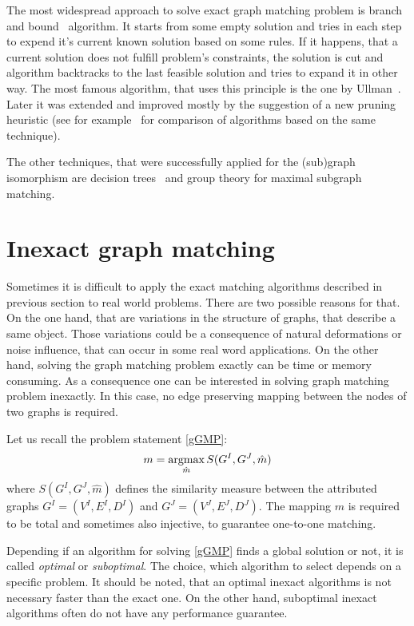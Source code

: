 The most widespread approach to solve exact graph matching problem is branch and bound~\cite{Reingold} algorithm. It starts from some empty solution and tries in each step to expend it's current known solution based on some rules. If it happens, that a current solution does not fulfill problem's constraints, the solution is cut and algorithm backtracks to the last feasible solution and tries to expand it in other way. The most famous algorithm, that uses this principle is the one by Ullman~\cite{Ullmann}. Later it was extended and improved mostly by the suggestion of a new pruning heuristic (see for example~\cite{Lee2013} for comparison of algorithms based on the same technique).

The other techniques, that were successfully applied for the (sub)graph isomorphism are decision trees~\cite{Messmer1999,Shearer1998,Shearer2001} and group theory\cite{McKay} for maximal subgraph matching. 

\section{Inexact graph matching}

Sometimes it is difficult to apply the exact matching algorithms described in previous section to real world problems. There are two possible reasons for that. On the one hand, that are variations in the structure of graphs, that describe a same object. Those variations could be a consequence of natural deformations or noise influence, that can occur in some real word applications. On the other hand, solving the graph matching problem exactly can be time or memory consuming. As a consequence one can be interested in solving graph matching problem inexactly. In this case, no edge preserving mapping between the nodes of two graphs is required.

Let us recall the problem statement \eqref{gGMP}: 
\begin{equation*}
m = \mathop{\rm argmax}_{\hat{m}}S(G^I, G^J, \hat{m})
\end{equation*}
where $S(G^I, G^J, \hat{m})$ defines the similarity measure between the attributed graphs $G^I = (V^I, E^I,D^I)$ and $G^J = (V^J, E^J,D^J)$. The mapping $m$ is required to be total and sometimes also injective, to guarantee one-to-one matching.

Depending if an algorithm for solving \eqref{gGMP} finds a global solution or not, it is called \emph{optimal} or \emph{suboptimal}. The choice, which algorithm to select depends on a specific problem. It should be noted, that an optimal inexact algorithms is not necessary faster than the exact one. On the other hand, suboptimal inexact algorithms often do not have any performance guarantee.

